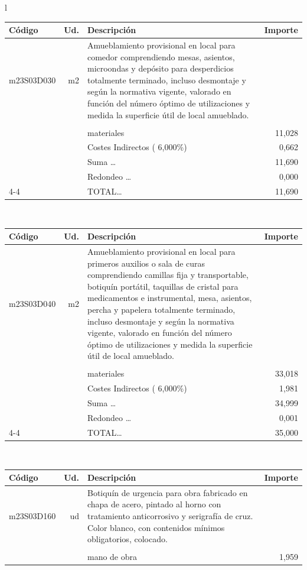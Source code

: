 \documentclass{book}%
\begin{document}
\begin{longtable}{l}
\begin{tabular}{l r p{60mm} r}
Código&Ud.&Descripción&Importe\\%
\hline%
m23S03D030&m2&Amueblamiento provisional en local para comedor comprendiendo mesas, asientos, microondas y depósito para desperdicios totalmente terminado, incluso desmontaje y según la normativa vigente, valorado en función del número óptimo de utilizaciones y medida la superficie útil de local amueblado.&\\%
&&&\\%
&&materiales&    11,028\\%
&&Costes Indirectos (     6,000\%)&     0,662\\%
&&Suma \ldots&    11,690\\%
&&Redondeo \ldots&     0,000\\%
\cline{4-4}%
&&TOTAL\ldots&    11,690\\%
\end{tabular}\\%
\begin{tabular}{l r p{60mm} r}%
Código&Ud.&Descripción&Importe\\%
\hline%
m23S03D040&m2&Amueblamiento provisional en local para primeros auxilios o sala de curas comprendiendo camillas fija y transportable, botiquín portátil, taquillas de cristal para medicamentos e instrumental, mesa, asientos, percha y papelera totalmente terminado, incluso desmontaje y según la normativa vigente, valorado en función del número óptimo de utilizaciones y medida la superficie útil de local amueblado.&\\%
&&&\\%
&&materiales&    33,018\\%
&&Costes Indirectos (     6,000\%)&     1,981\\%
&&Suma \ldots&    34,999\\%
&&Redondeo \ldots&     0,001\\%
\cline{4-4}%
&&TOTAL\ldots&    35,000\\%
\end{tabular}\\%
\begin{tabular}{l r p{60mm} r}%
Código&Ud.&Descripción&Importe\\%
\hline%
m23S03D160&ud&Botiquín de urgencia para obra fabricado en chapa de acero, pintado al horno con tratamiento anticorrosivo y serigrafía de cruz. Color blanco, con contenidos mínimos obligatorios, colocado.&\\%
&&&\\%
&&mano de obra&     1,959\\%

\end{tabular}
\end{longtable}
\end{document}
